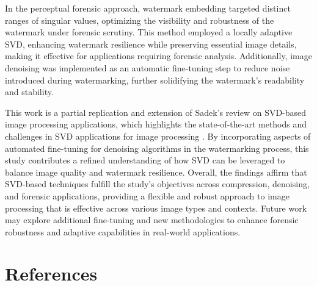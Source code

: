 \documentclass[
  journal,
]{IEEEtran}%
\begin{document}
In the perceptual forensic approach, watermark embedding targeted
distinct ranges of singular values, optimizing the visibility and
robustness of the watermark under forensic scrutiny. This method
employed a locally adaptive SVD, enhancing watermark resilience while
preserving essential image details, making it effective for applications
requiring forensic analysis. Additionally, image denoising was
implemented as an automatic fine-tuning step to reduce noise introduced
during watermarking, further solidifying the watermark's readability and
stability.

This work is a partial replication and extension of Sadek's review on
SVD-based image processing applications, which highlights the
state-of-the-art methods and challenges in SVD applications for image
processing . By incorporating
aspects of automated fine-tuning for denoising algorithms in the
watermarking process, this study contributes a refined understanding of
how SVD can be leveraged to balance image quality and watermark
resilience. Overall, the findings affirm that SVD-based techniques
fulfill the study's objectives across compression, denoising, and
forensic applications, providing a flexible and robust approach to image
processing that is effective across various image types and contexts.
Future work may explore additional fine-tuning and new methodologies to
enhance forensic robustness and adaptive capabilities in real-world
applications.

\section{References}\label{references}
\end{document}
